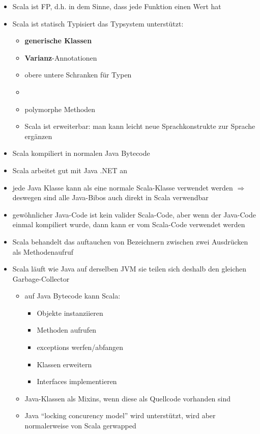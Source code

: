 \begin{itemize}
  \item Scala ist FP, d.h. in dem Sinne, dass jede Funktion einen Wert hat
  \item Scala ist statisch Typisiert \und das Typsystem unterstützt:
  \begin{itemize}
    \item \textbf{generische Klassen}
    \item \textbf{Varianz}-Annotationen
    \item obere \und untere Schranken für Typen
    \item {}
    \item polymorphe Methoden
    \item Scala ist erweiterbar: man kann leicht neue Sprachkonstrukte
    zur Sprache ergänzen
  \end{itemize}
  \item Scala kompiliert in normalen Java Bytecode
  \item Scala arbeitet gut mit Java \und .NET an
  \item jede Java Klasse kann als eine normale Scala-Klasse verwendet werden
  $\Rightarrow$ deswegen sind alle Java-Bibos auch direkt in Scala verwendbar
  \item gewöhnlicher Java-Code ist kein valider Scala-Code, aber wenn der
  Java-Code einmal kompiliert wurde, dann kann er vom Scala-Code verwendet
  werden
  \item Scala behandelt das auftauchen von Bezeichnern zwischen zwei
  Ausdrücken als Methodenaufruf
  \item Scala läuft wie Java auf derselben JVM \und sie teilen sich deshalb
  den gleichen Garbage-Collector
  \begin{itemize}
    \item auf Java Bytecode kann Scala:
    \begin{itemize}
      \item Objekte instanziieren
      \item Methoden aufrufen
      \item exceptions werfen/abfangen
      \item Klassen erweitern
      \item Interfaces implementieren
    \end{itemize}    
    \item Java-Klassen als Mixins, wenn diese als Quellcode vorhanden
    sind
    \item Java \enquote{locking \und concurency model} wird unterstützt, wird
    aber normalerweise von Scala gerwapped

\end{itemize}
\end{itemize}

